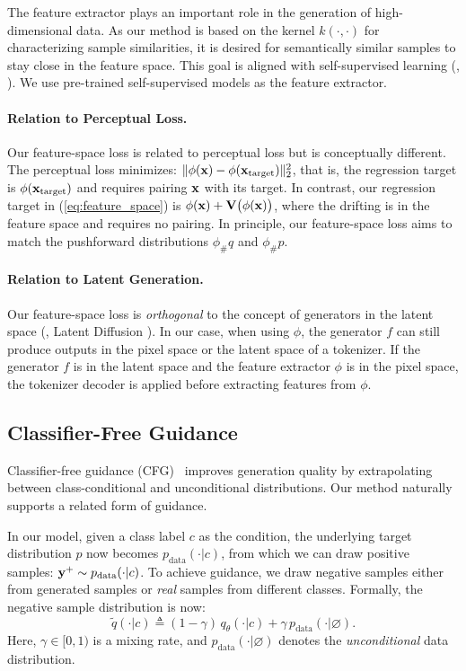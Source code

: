 The feature extractor plays an important role in the generation of high-dimensional data.
As our method is based on the kernel $k(\cdot, \cdot)$ for characterizing sample similarities, it is desired for semantically similar samples to stay close in the feature space. This goal is aligned with self-supervised learning (\eg, \citealt{he2020momentum,chen2020simple}). 
We use pre-trained self-supervised models as the feature extractor.

\paragraph{Relation to Perceptual Loss.}
Our feature-space loss is related to perceptual loss \cite{zhang2018unreasonable} but is conceptually different. The perceptual loss minimizes: $\|\phi(\mathbf{x})-\phi(\mathbf{x}_\text{target})\|_2^2$, that is, the regression target is $\phi(\mathbf{x}_\text{target})$ and requires pairing $\mathbf{x}$ with its target.
In contrast, our regression target in (\ref{eq:feature_space}) is
$
\phi(\mathbf{x})
+
\mathbf{V}\big(\phi(\mathbf{x})\big)
$, where the drifting is in the feature space and requires no pairing. 
In principle, our feature-space loss aims to match the pushforward distributions $\phi_\#q$ and $\phi_\#p$.

\paragraph{Relation to Latent Generation.}
Our feature-space loss is \textit{orthogonal} to the concept of generators in the latent space (\eg, Latent Diffusion \cite{rombach2022high}).
In our case, when using $\phi$,
the generator $f$ can still produce outputs in the pixel space or the latent space of a tokenizer.
If the generator $f$ is in the latent space and the feature extractor $\phi$ is in the pixel space, the tokenizer decoder is applied before extracting features from $\phi$.


\subsection{Classifier-Free Guidance}
\label{subsec:additive_guidance}

Classifier-free guidance (CFG)~\cite{ho2022classifier} improves generation quality by extrapolating between class-conditional and unconditional distributions.
Our method naturally supports a related form of guidance.


In our model, given a class label $c$ as the condition, the underlying target distribution $p$ now becomes $p_{\text{data}}(\cdot|c)$, from which we can draw positive samples: $\mathbf{y}^+ \sim p_{\text{data}}(\cdot|c)$.
To achieve guidance, we draw {negative} samples either from generated samples or \textit{real} samples from different classes.
Formally, the negative sample distribution is now:
\begin{equation}
\tilde{q}(\cdot|c) \triangleq (1-\gamma)\,q_\theta(\cdot|c)   + \gamma\,p_{\text{data}}(\cdot | \varnothing).
\label{eq:cfg1}
\end{equation}
Here, $\gamma \in [0, 1)$ is a mixing rate,
and $p_{\text{data}}(\cdot | \varnothing)$ denotes the \textit{unconditional} data distribution\footnotemark{}.

